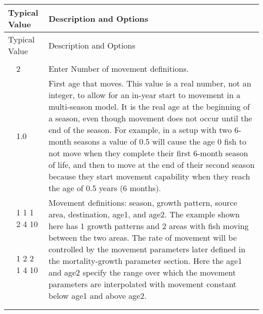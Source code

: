 \begin{longtable}{p{0.5cm} p{2cm} p{12.5cm}}
	\hline
	\multicolumn{2}{l}{Typical Value} & Description and Options \Tstrut\Bstrut\\
	\hline
	\endfirsthead

	\hline
	\multicolumn{2}{l}{Typical Value} & Description and Options \Tstrut\Bstrut\\
	\hline
	\endhead

	\hline
	\endfoot

	\endlastfoot
	
	\multicolumn{3}{l}{COND: only if areas > 1} \Tstrut\\ 
	& 2 & Enter Number of movement definitions. \Tstrut\\		
	\Tstrut & 1.0 & First age that moves. This value is a real number, not an integer, to allow for an in-year start to movement in a multi-season model. It is the real age at the beginning of a season, even though movement does not occur until the end of the season. For example, in a setup with two 6-month seasons a value of 0.5 will cause the age 0 fish to not move when they complete their first 6-month season of life, and then to move at the end of their second season because they start movement capability when they reach the age of 0.5 years (6 months). \\

	\Tstrut & 1 1 1 2 4 10 & \multicolumn{1}{l}{\multirow{5}{6cm}{\parbox{12cm}{Movement definitions: season, growth pattern, source area, destination, age1, and age2. The example shown here has 1 growth patterns and 2 areas with fish moving between the two areas. The rate of movement will be controlled by the movement parameters later defined in the mortality-growth parameter section. Here the age1 and age2 specify the range over which the movement parameters are interpolated with movement constant below age1 and above age2.}}} \\
	& 1 2 2 1 4 10 & \Bstrut\\
	\\
	\\
	\\
	\\ 
	\\
	\hline
	\end{longtable}
	\vspace*{-\baselineskip}
	

